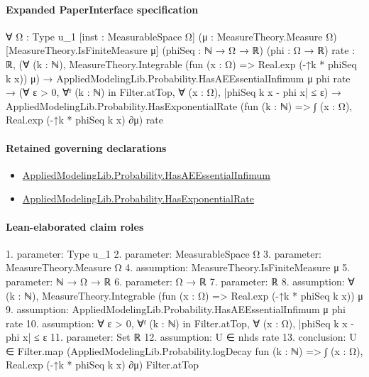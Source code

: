 \documentclass[10pt]{article}
\begin{document}
\paragraph{Expanded PaperInterface specification}
\begin{ReviewVerbatim}
∀ {Ω : Type u_1} [inst : MeasurableSpace Ω] (μ : MeasureTheory.Measure Ω) [MeasureTheory.IsFiniteMeasure μ]
  (phiSeq : ℕ → Ω → ℝ) (phi : Ω → ℝ) {rate : ℝ},
  (∀ (k : ℕ), MeasureTheory.Integrable (fun (x : Ω) => Real.exp (-↑k * phiSeq k x)) μ) →
    AppliedModelingLib.Probability.HasAEEssentialInfimum μ phi rate →
      (∀ ε > 0, ∀ᶠ (k : ℕ) in Filter.atTop, ∀ (x : Ω), |phiSeq k x - phi x| ≤ ε) →
        AppliedModelingLib.Probability.HasExponentialRate (fun (k : ℕ) => ∫ (x : Ω), Real.exp (-↑k * phiSeq k x) ∂μ)
          rate
\end{ReviewVerbatim}

\paragraph{Retained governing declarations}
\begin{itemize}\raggedright
\item \hyperlink{governing-declaration-d6063268c2725f36}{Applied\allowbreak{}Modeling\allowbreak{}Lib.\allowbreak{}Probability.\allowbreak{}Has\allowbreak{}AE\allowbreak{}Essential\allowbreak{}Infimum}
\item \hyperlink{governing-declaration-e023a17eef63c747}{Applied\allowbreak{}Modeling\allowbreak{}Lib.\allowbreak{}Probability.\allowbreak{}Has\allowbreak{}Exponential\allowbreak{}Rate}
\end{itemize}
\paragraph{Lean-elaborated claim roles}\begin{ReviewVerbatim}
1. parameter: Type u_1
2. parameter: MeasurableSpace Ω
3. parameter: MeasureTheory.Measure Ω
4. assumption: MeasureTheory.IsFiniteMeasure μ
5. parameter: ℕ → Ω → ℝ
6. parameter: Ω → ℝ
7. parameter: ℝ
8. assumption: ∀ (k : ℕ), MeasureTheory.Integrable (fun (x : Ω) => Real.exp (-↑k * phiSeq k x)) μ
9. assumption: AppliedModelingLib.Probability.HasAEEssentialInfimum μ phi rate
10. assumption: ∀ ε > 0, ∀ᶠ (k : ℕ) in Filter.atTop, ∀ (x : Ω), |phiSeq k x - phi x| ≤ ε
11. parameter: Set ℝ
12. assumption: U ∈ nhds rate
13. conclusion: U ∈
  Filter.map (AppliedModelingLib.Probability.logDecay fun (k : ℕ) => ∫ (x : Ω), Real.exp (-↑k * phiSeq k x) ∂μ)
    Filter.atTop
\end{ReviewVerbatim}
\end{document}
